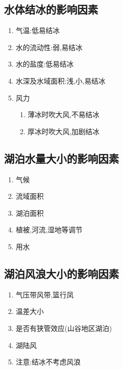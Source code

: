 \documentclass[a4paper]{article}
\begin{document}
    \subsection{水体结冰的影响因素}
    \begin{enumerate}
        \item 气温:低易结冰
        \item 水的流动性:弱,易结冰
        \item 水的盐度:低易结冰
        \item 水深及水域面积:浅,小,易结冰
        \item 风力
        \begin{enumerate}
            \item 薄冰时吹大风,不易结冰
            \item 厚冰时吹大风,加剧结冰
        \end{enumerate}
    \end{enumerate}
    \subsection{湖泊水量大小的影响因素}
    \begin{enumerate}
        \item 气候
        \item 流域面积
        \item 湖泊面积
        \item 植被,河流,湿地等调节
        \item 用水
    \end{enumerate}
    \subsection{湖泊风浪大小的影响因素}
    \begin{enumerate}
        \item 气压带风带,篮行凤
        \item 温差大小
        \item 是否有狭管效应(山谷地区湖泊)
        \item 湖陆风
        \item 注意:结冰不考虑风浪
    \end{enumerate}
\end{document}
